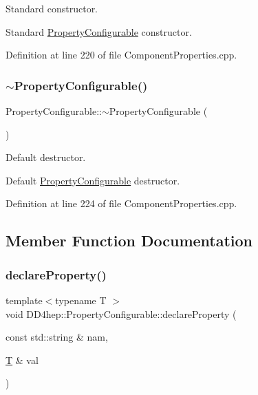 Standard constructor. 

Standard \hyperlink{class_d_d4hep_1_1_property_configurable}{Property\+Configurable} constructor. 

Definition at line 220 of file Component\+Properties.\+cpp.

\hypertarget{class_d_d4hep_1_1_property_configurable_a49ef91ca6bbdf3f9d835e5f18f3a3a27}{}\label{class_d_d4hep_1_1_property_configurable_a49ef91ca6bbdf3f9d835e5f18f3a3a27} 
\subsubsection{\texorpdfstring{$\sim$\+Property\+Configurable()}{~PropertyConfigurable()}}
{\footnotesize\ttfamily Property\+Configurable\+::$\sim$\+Property\+Configurable (\begin{DoxyParamCaption}{ }\end{DoxyParamCaption})\hspace{0.3cm}{\ttfamily [virtual]}}



Default destructor. 

Default \hyperlink{class_d_d4hep_1_1_property_configurable}{Property\+Configurable} destructor. 

Definition at line 224 of file Component\+Properties.\+cpp.



\subsection{Member Function Documentation}
\hypertarget{class_d_d4hep_1_1_property_configurable_ae05fd8e07c3bf4f89b9bcc84714a7950}{}\label{class_d_d4hep_1_1_property_configurable_ae05fd8e07c3bf4f89b9bcc84714a7950} 
\subsubsection{\texorpdfstring{declare\+Property()}{declareProperty()}\hspace{0.1cm}{\footnotesize\ttfamily [1/2]}}
{\footnotesize\ttfamily template$<$typename T $>$ \\
void D\+D4hep\+::\+Property\+Configurable\+::declare\+Property (\begin{DoxyParamCaption}\item[{const std\+::string \&}]{nam,  }\item[{\hyperlink{class_t}{T} \&}]{val }\end{DoxyParamCaption})}



